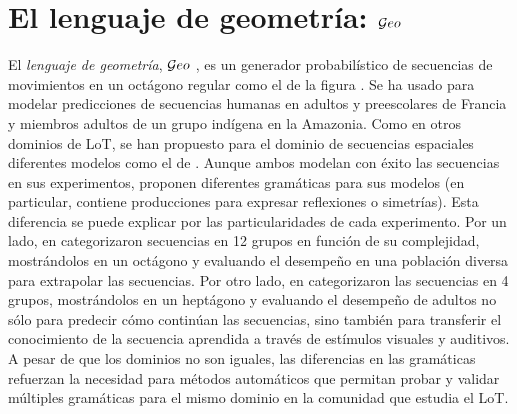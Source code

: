 \section{El lenguaje de geometría: $\mathcal Geo$}


El \textit{lenguaje de geometría}, $\mathcal Geo$ \cite{amalric2017language}, es un generador probabilístico de secuencias de movimientos en un octágono regular como el de la figura . Se ha usado para modelar predicciones de secuencias humanas en adultos y preescolares de Francia y miembros adultos de un grupo indígena en la Amazonia. Como en otros dominios de LoT, se han propuesto para el dominio de secuencias espaciales diferentes modelos como el de \cite{yildirim2015learning}. Aunque ambos modelan con éxito las secuencias en sus experimentos, proponen diferentes gramáticas para sus modelos (en particular, \cite{amalric2017language} contiene producciones para expresar reflexiones o simetrías). Esta diferencia se puede explicar por las particularidades de cada experimento. Por un lado, en \cite{amalric2017language} categorizaron secuencias en 12 grupos en función de su complejidad, mostrándolos en un octágono y evaluando el desempeño en una población diversa para extrapolar las secuencias. Por otro lado, en \cite{yildirim2015learning} categorizaron las secuencias en 4 grupos, mostrándolos en un heptágono y evaluando el desempeño de adultos no sólo para predecir cómo continúan las secuencias, sino también para transferir el conocimiento de la secuencia aprendida a través de estímulos visuales y auditivos. A pesar de que los dominios no son iguales, las diferencias en las gramáticas refuerzan la necesidad para métodos automáticos que permitan probar y validar múltiples gramáticas para el mismo dominio en la comunidad que estudia el LoT.

